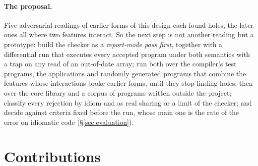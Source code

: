 \paragraph{The proposal.} Five adversarial readings of earlier forms of this design each found holes, the
later ones all where two features interact. So the next step is not another reading but a prototype: build
the checker as a
\emph{report-mode pass first}, together with a
differential run that executes every accepted program under both semantics with a trap on any read
of an out-of-date array; run both over the compiler's test programs, the applications and randomly
generated programs that combine the features whose interactions broke earlier forms, until they stop
finding holes; then over the core library and
a corpus of programs written outside the project; classify every rejection by idiom
and as real sharing or a limit of the checker; and decide against criteria fixed before the run, whose
main one is the rate of the error on idiomatic code (\S\ref{sec:evaluation}).

\section{Contributions}

